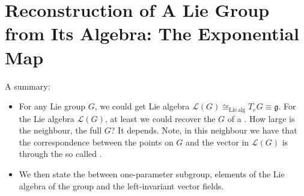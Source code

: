 \documentclass{article}
\begin{document}
\section{Reconstruction of A Lie Group from Its Algebra: The Exponential Map}\label{sec:exp}
A summary:
\begin{itemize}[$\blacktriangleright$]
\item
For any Lie group $G$, we could get Lie algebra $\mathcal{L}(G)\cong_\mathrm{Lie\, alg}T_eG\equiv \mathfrak{g}$. For the Lie algebra $\mathcal{L}(G)$, at least we could recover the $G$ of a . How large is the neighbour, the full $G$? It depends. Note, in this neighbour we have that the correspondence between the points on $G$ and the vector in $\mathcal{L}(G)$ is  through the so called .
\item We then state the  between one-parameter subgroup, elements of the Lie algebra of the group and the left-invariant vector fields.
\end{itemize}
\end{document}
